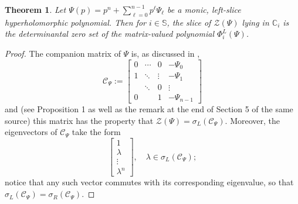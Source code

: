 \documentclass[11pt,reqno]{amsart}
\def\l{\lambda}
\def\s{\sigma}
\def\P{\Phi}
\def\Q{\Psi}
\def\CC{\mathbb{C}}
\def\SS{\mathbb{S}}
\def\cC{\mathcal{C}}
\def\cZ{\mathcal{Z}}
\newtheorem{theorem}{Theorem}[section]
\theoremstyle{definition}
\numberwithin{equation}{section}
\begin{document}
\begin{theorem}
    \label{thm:leftZeroSet}
    Let \(\Q(p) = p^n + \sum_{\ell = 0}^{n-1} p^\ell \Q_\ell\) be a monic, left-slice hyperholomorphic polynomial. Then for \(i \in \SS\), the slice of \(\cZ(\Q)\) lying in \(\CC_i\) is the determinantal zero set of the matrix-valued polynomial \(\P^L_i(\Q)\).
\end{theorem}
\begin{proof}
    The companion matrix of \(\Q\) is, as discussed in \cite{SPV01},
    \[
        \cC_\Q := \begin{bmatrix} 0 & \cdots & 0 & -\Q_0 \\ 1 & \ddots & \vdots & -\Q_1 \\ & \ddots & 0 & \vdots \\ 0 & & 1 & -\Q_{n-1} \end{bmatrix}
    \]
    and (see Proposition 1 as well as the remark at the end of Section 5 of the same source) this matrix has the property that \(\cZ(\Q) = \s_L(\cC_\Q)\). Moreover, the eigenvectors of \(\cC_\Q\) take the form
    \[
        \begin{bmatrix} 1 \\ \l \\ \vdots \\ \l^n \end{bmatrix}, \quad \l \in \s_L(\cC_\Q);
    \]
    notice that any such vector commutes with its corresponding eigenvalue, so that \(\s_L(\cC_\Q) = \s_R(\cC_\Q)\).
    

\end{proof}
\end{document}

